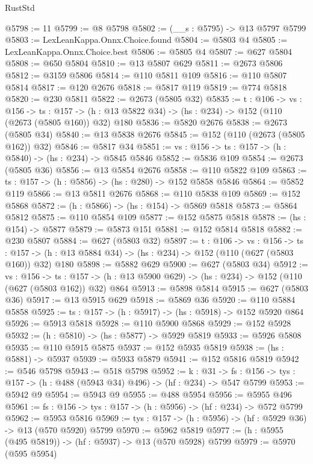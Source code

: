 \begin{lexlean}{RustStd}
\begin{coremodule}
@5798 := 11
@5799 := @8 @5798
@5802 := (__s : @5795) -> @13 @5797 @5799
@5803 := LexLeanKappa.Onnx.Choice.found
@5804 := @5803 @4
@5805 := LexLeanKappa.Onnx.Choice.best
@5806 := @5805 @4
@5807 := @627 @5804
@5808 := @650 @5804
@5810 := @13 @5807 @629
@5811 := @2673 @5806
@5812 := @3159 @5806
@5814 := @110 @5811 @109
@5816 := @110 @5807 @5814
@5817 := @120 @2676
@5818 := @5817 @119
@5819 := @774 @5818
@5820 := @230 @5811
@5822 := @2673 (@5805 @32)
@5835 := {t : @106} ->
  {vs : @156} ->
  {ts : @157} -> (h : @13 @5822 @34) -> (hs : @234) -> @152 (@110 (@2673 (@5805 @160)) @32) @180
@5836 := @5820 @2676
@5838 := @2673 (@5805 @34)
@5840 := @13 @5838 @2676
@5845 := @152 (@110 (@2673 (@5805 @162)) @32)
@5846 := @5817 @34
@5851 := {vs : @156} -> {ts : @157} -> (h : @5840) -> (hs : @234) -> @5845 @5846
@5852 := @5836 @109
@5854 := @2673 (@5805 @36)
@5856 := @13 @5854 @2676
@5858 := @110 @5822 @109
@5863 := {ts : @157} -> (h : @5856) -> (hs : @280) -> @152 @5858 @5846
@5864 := @5852 @119
@5866 := @13 @5811 @2676
@5868 := @110 @5838 @109
@5869 := @152 @5868
@5872 := (h : @5866) -> (hs : @154) -> @5869 @5818
@5873 := @5864 @5812
@5875 := @110 @5854 @109
@5877 := @152 @5875 @5818
@5878 := (hs : @154) -> @5877
@5879 := @5873 @151
@5881 := @152 @5814 @5818
@5882 := @230 @5807
@5884 := @627 (@5803 @32)
@5897 := {t : @106} ->
  {vs : @156} ->
  {ts : @157} -> (h : @13 @5884 @34) -> (hs : @234) -> @152 (@110 (@627 (@5803 @160)) @32) @180
@5898 := @5882 @629
@5900 := @627 (@5803 @34)
@5912 := {vs : @156} ->
  {ts : @157} -> (h : @13 @5900 @629) -> (hs : @234) -> @152 (@110 (@627 (@5803 @162)) @32) @864
@5913 := @5898 @5814
@5915 := @627 (@5803 @36)
@5917 := @13 @5915 @629
@5918 := @5869 @36
@5920 := @110 @5884 @5858
@5925 := {ts : @157} -> (h : @5917) -> (hs : @5918) -> @152 @5920 @864
@5926 := @5913 @5818
@5928 := @110 @5900 @5868
@5929 := @152 @5928
@5932 := (h : @5810) -> (hs : @5877) -> @5929 @5819
@5933 := @5926 @5808
@5935 := @110 @5915 @5875
@5937 := @152 @5935 @5819
@5938 := (hs : @5881) -> @5937
@5939 := @5933 @5879
@5941 := @152 @5816 @5819
@5942 := @546 @5798
@5943 := @518 @5798
@5952 := {k : @31} ->
  {fs : @156} -> {tys : @157} -> (h : @488 (@5943 @34) @496) -> (hf : @234) -> @547 @5799
@5953 := @5942 @9
@5954 := @5943 @9
@5955 := @488 @5954
@5956 := @5955 @496
@5961 := {fs : @156} -> {tys : @157} -> (h : @5956) -> (hf : @234) -> @572 @5799
@5962 := @5953 @5816
@5969 := {tys : @157} -> (h : @5956) -> (hf : @5929 @36) -> @13 (@570 @5920) @5799
@5970 := @5962 @5819
@5977 := (h : @5955 (@495 @5819)) -> (hf : @5937) -> @13 (@570 @5928) @5799
@5979 := @5970 (@595 @5954)

\end{coremodule}
\end{lexlean}
